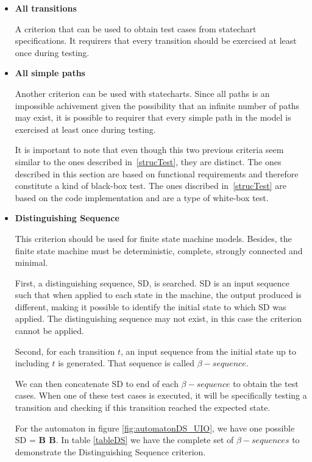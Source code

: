 \begin{itemize}

\item \textbf{All transitions}

A criterion that can be used to obtain test cases from statechart specifications. It requirers that every transition should be exercised at least once during testing.

\item \textbf{All simple paths}

Another criterion can be used with statecharts. Since all paths is an impossible achivement given the possibility that an infinite number of paths may exist, it is possible to requirer that every simple path in the model is exercised at least once during testing.

It is important to note that even though this two previous criteria seem similar to the ones described in~\ref{strucTest}, they are distinct. The ones described in this section are based on functional requirements and therefore constitute a kind of black-box test. The ones discribed in~\ref{strucTest} are based on the code implementation and are a type of white-box test.

\item \textbf{Distinguishing Sequence}

This criterion should be used for finite state machine models. Besides, the finite state machine must be deterministic, complete, strongly connected and minimal. 

First, a distinguishing sequence, SD, is searched. SD is an input sequence such that when applied to each state in the machine, the output produced is different, making it possible to identify the initial state to which SD was applied. The distinguishing sequence may not exist, in this case the criterion cannot be applied.

Second, for each transition $t$, an input sequence from the initial state up to including $t$ is generated. That sequence is called $\beta-sequence$.

We can then concatenate SD to end of each $\beta-sequence$ to obtain the test cases. When one of these test cases is executed, it will be specifically testing a transition and checking if this transition reached the expected state.

For the automaton in figure \ref{fig:automatonDS_UIO}, we have one possible SD = \textbf{B B}. In table \ref{tableDS} we have the complete set of $\beta-sequences$ to demonstrate the Distinguishing Sequence criterion.


\end{itemize}
